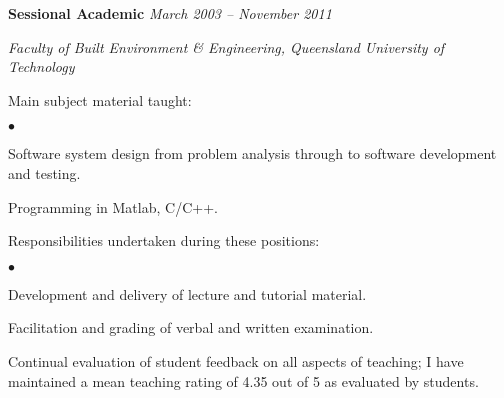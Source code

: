 \documentclass[margin,line]{resume}
\newenvironment{list1}{
  \begin{list}{}{%
      \setlength{\itemsep}{0in}
      \setlength{\parsep}{0in} \setlength{\parskip}{0in}
      \setlength{\topsep}{0in} \setlength{\partopsep}{0in}
      \setlength{\leftmargin}{0.17in}}}{\end{list}}
\newenvironment{list2}{
  \begin{list}{$\bullet$}{%
      \setlength{\itemsep}{0in}
      \setlength{\parsep}{0in} \setlength{\parskip}{0in}
      \setlength{\topsep}{0in} \setlength{\partopsep}{0in}
      \setlength{\leftmargin}{0.2in}}}{\end{list}}
\begin{document}
\begin{resume}
{\bf Sessional Academic} \hfill {\it March 2003 -- November 2011}\\
\vspace{-0.85\baselineskip}
\begin{list1}
\item {\it Faculty of Built Environment \& Engineering, Queensland
    University of Technology}
\item Main subject material taught:
\begin{list2}
\item Software system design from problem analysis through to software development and testing.
\item Programming in Matlab, C/C++.\\
\end{list2}
\item Responsibilities undertaken during these positions:
\begin{list2}
\item Development and delivery of lecture and tutorial material.
\item Facilitation and grading of verbal and written examination.
\item Continual evaluation of student feedback on all aspects of teaching; I have maintained a mean teaching rating of 4.35 out of 5 as evaluated by students.
\end{list2}
\end{list1}

\newpage


\end{resume}
\end{document}
